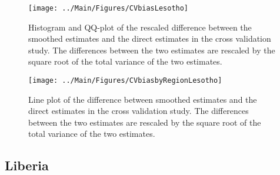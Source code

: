 \documentclass[12pt]{article}\usepackage[]{graphicx}\usepackage[]{color}
\newenvironment{knitrout}{}{} %
\begin{document}
\begin{knitrout}
\color{fgcolor}\begin{figure}[bht]

{\centering \texttt{[image: ../Main/Figures/CVbiasLesotho]} 

}

\caption[Histogram and QQ-plot of the rescaled difference between the smoothed estimates and the direct estimates in the cross validation study]{Histogram and QQ-plot of the rescaled difference between the smoothed estimates and the direct estimates in the cross validation study. The differences between the two estimates are rescaled by the square root of the total variance of the two estimates.}\label{fig:unnamed-chunk-179}
\end{figure}


\end{knitrout}

\begin{knitrout}
\color{fgcolor}\begin{figure}[bht]

{\centering \texttt{[image: ../Main/Figures/CVbiasbyRegionLesotho]} 

}

\caption[Line plot of the difference between smoothed estimates and the direct estimates in the cross validation study]{Line plot of the difference between smoothed estimates and the direct estimates in the cross validation study. The differences between the two estimates are rescaled by the square root of the total variance of the two estimates.}\label{fig:unnamed-chunk-180}
\end{figure}


\end{knitrout}


\clearpage
\subsection{Liberia}


\end{document}
